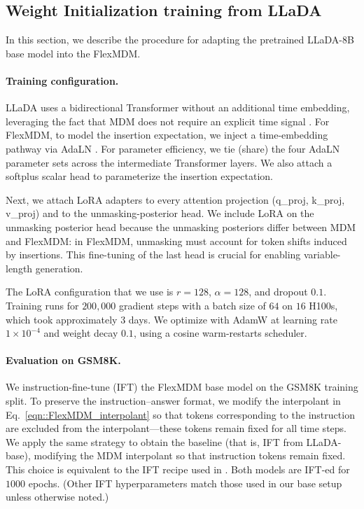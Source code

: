 \subsection{Weight Initialization training from LLaDA}
In this section, we describe the procedure for adapting the pretrained LLaDA-8B base model into the FlexMDM.

\paragraph{Training configuration.}
LLaDA uses a bidirectional Transformer without an additional time embedding, leveraging the fact that MDM does not require an explicit time signal \citep{zheng2024masked}. For FlexMDM, to model the insertion expectation, we inject a time-embedding pathway via AdaLN \citep{peebles2023scalable}. For parameter efficiency, we tie (share) the four AdaLN parameter sets across the intermediate Transformer layers. We also attach a softplus scalar head to parameterize the insertion expectation.

Next, we attach LoRA adapters \citep{hu2022lora} to every attention projection (q\_proj, k\_proj, v\_proj) and to the unmasking-posterior head. We include LoRA on the unmasking posterior head because the unmasking posteriors differ between MDM and FlexMDM: in FlexMDM, unmasking must account for token shifts induced by insertions. This fine-tuning of the last head is crucial for enabling variable-length generation.

The LoRA configuration that we use is $r=128$, $\alpha=128$, and dropout $0.1$. Training runs for $200,000$ gradient steps with a batch size of $64$ on $16$ H100s, which took approximately 3 days. We optimize with AdamW \citep{loshchilov2017decoupled} at learning rate $1\times10^{-4}$ and weight decay $0.1$, using a cosine warm-restarts scheduler.

\paragraph{Evaluation on GSM8K.}
We instruction-fine-tune (IFT) the FlexMDM base model on the GSM8K training split. To preserve the instruction–answer format, we modify the interpolant in Eq.~\ref{eqn::FlexMDM_interpolant} so that tokens corresponding to the instruction are excluded from the interpolant—these tokens remain fixed for all time steps. We apply the same strategy to obtain the baseline (that is, IFT from LLaDA-base), modifying the MDM interpolant so that instruction tokens remain fixed. This choice is equivalent to the IFT recipe used in \cite{nie2025large,dream2025}. Both models are IFT-ed for $1000$ epochs. (Other IFT hyperparameters match those used in our base setup unless otherwise noted.)

